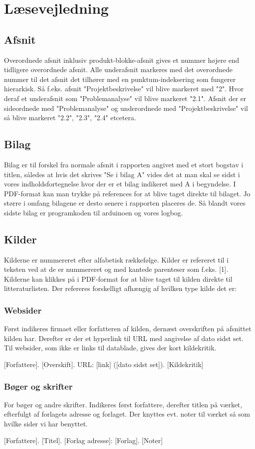 \section{Læsevejledning}
\subsection{Afsnit}
Overordnede afsnit inklusiv produkt-blokke-afsnit gives et nummer højere end tidligere overordnede afsnit. Alle underafsnit markeres med det overordnede nummer til det afsnit det tilhører med en punktum-indeksering som fungerer hierarkisk. Så f.eks. afsnit "Projektbeskrivelse" vil blive markeret med "2". Hvor deraf et underafsnit som "Problemanalyse" vil blive markeret "2.1". Afsnit der er sideordnede med "Problemanalyse" og underordnede med "Projektbeskrivelse" vil så blive markeret "2.2", "2.3", "2.4" etcetera.  
\subsection{Bilag}
Bilag er til forskel fra normale afsnit i rapporten angivet med et stort bogstav i titlen, således at hvis det skrives "Se i bilag A" vides det at man skal se sidst i vores indholdsfortegnelse hvor der er et bilag indikeret med A i begyndelse. I PDF-format kan man trykke på references for at blive taget direkte til bilaget.
Jo større i omfang bilagene er desto senere i rapporten placeres de. Så blandt vores sidste bilag er programkoden til arduinoen og vores logbog.
\subsection{Kilder}
Kilderne er nummereret efter alfabetisk rækkefølge. Kilder er refereret til i teksten ved at de er nummereret og med kantede parenteser som f.eks. [1]. Kilderne kan klikkes på i PDF-format for at blive taget til kilden direkte til litteraturlisten. Der refereres forskelligt afhængig af hvilken type kilde det er:


\subsubsection{Websider}
Først indikeres firmaet eller forfatteren af kilden, dernæst overskriften på afsnittet kilden har. Derefter er der et hyperlink til URL med angivelse af dato sidst set. Til websider, som ikke er links til datablade, gives der kort kildekritik.


[Forfattere]. [Overskift]. URL: [link] ([dato sidst set]). [Kildekritik]

\subsubsection{Bøger og skrifter}
For bøger og andre skrifter. Indikeres først forfattere, derefter titlen på værket, efterfulgt af forlagets adresse og forlaget. Der knyttes evt. noter til værket så som hvilke sider vi har benyttet.

[Forfattere]. [Titel]. [Forlag adresse]: [Forlag]. [Noter]
